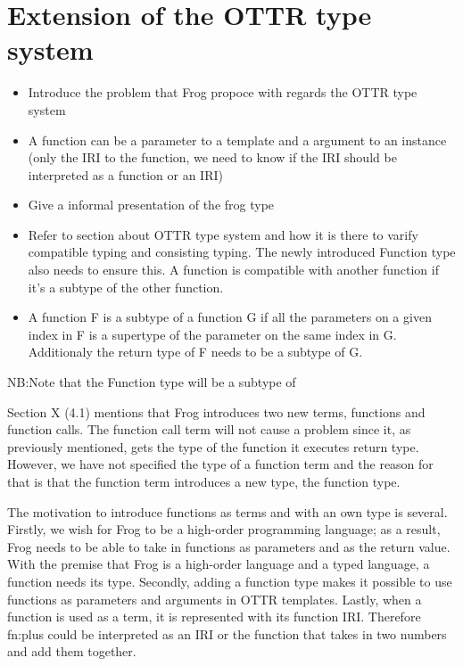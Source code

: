 \section{Extension of the OTTR type system}
\label{extension_ottr_type}
\begin{itemize}
    \item Introduce the problem that Frog propoce with regards the OTTR type system 
    \item A function can be a parameter to a template and a argument to an instance (only the IRI to the function, we need to know if the IRI should be interpreted as a function or an IRI)
    \item Give a informal presentation of the frog type 
    \item Refer to section about OTTR type system and how it is there to varify compatible typing and consisting typing. The newly introduced Function type also needs to ensure this. A function is compatible with  another function if it's a subtype of the other function.
    \item A function F is a subtype of a function G if all the parameters on a given index in F is a supertype of the parameter on the same index in G. Additionaly the return type of F needs to be a subtype of G.
\end{itemize}

NB:Note that the Function type will be a subtype of 

\para
Section X (4.1) mentions that Frog introduces two new terms, functions and function calls. The function call term will not cause a problem since it, as previously mentioned, gets the type of the function it executes return type. However, we have not specified the type of a function term and the reason for that is that the function term introduces a new type, the function type.  

\para
The motivation to introduce functions as terms and with an own type is several. Firstly, we wish for Frog to be a high-order programming language; as a result, Frog needs to be able to take in functions as parameters and as the return value.  With the premise that Frog is a high-order language and a typed language, a function needs its type. Secondly, adding a function type makes it possible to use functions as parameters and arguments in  OTTR templates. Lastly, when a function is used as a term, it is represented with its function IRI. Therefore fn:plus could be interpreted as an IRI or the function that takes in two numbers and add them together. 

